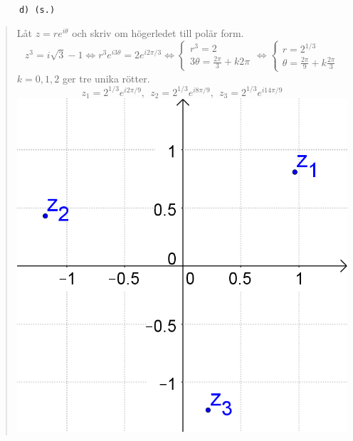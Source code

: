\documentclass[a4paper]{article}
\newcommand{\tskcol}[1]{\textcolor{tskcol}{#1}}
\begin{document}
	\texttt{\tskcol{~~~~~~d) (s.)}}
	\begin{quotation}
		\noindent
		Låt $z=re^{i\theta}$ och skriv om högerledet till polär form.
		\[z^3=i\sqrt{3}-1 \Leftrightarrow
		r^3e^{i3\theta}=2e^{i2\pi/3} \Leftrightarrow
		\begin{cases}
		r^3 = 2 \\
		3\theta=\frac{2\pi}{3}+k2\pi
		\end{cases} \Leftrightarrow
		\begin{cases}
		r=2^{1/3} \\
		\theta=\frac{2\pi}{9}+k\frac{2\pi}{3}
		\end{cases}\] 
		$k=0,1,2$ ger tre unika rötter.
		\[z_1=2^{1/3}e^{i2\pi/9},~~
		z_2=2^{1/3}e^{i8\pi/9},~~
		z_3=2^{1/3}e^{i14\pi/9}\]
		\includegraphics[scale=0.2]{images/641d.PNG}
	\end{quotation}
	
\end{document}
